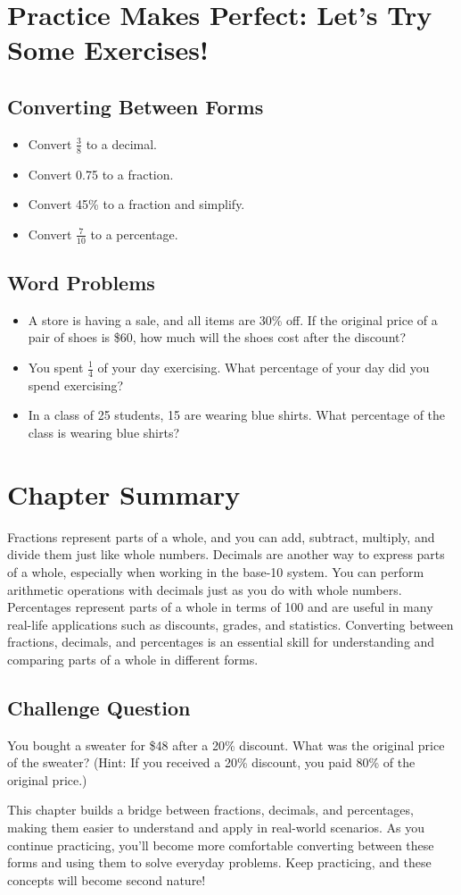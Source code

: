 \section{Practice Makes Perfect: Let’s Try Some Exercises!}
\subsection{Converting Between Forms}
\begin{itemize}
    \item Convert $\frac{3}{8}$ to a decimal.
    \item Convert 0.75 to a fraction.
    \item Convert 45\% to a fraction and simplify.
    \item Convert $\frac{7}{10}$ to a percentage.
\end{itemize}

\subsection{Word Problems}
\begin{itemize}
    \item A store is having a sale, and all items are 30\% off. If the original price of a pair of shoes is \$60, how much will the shoes cost after the discount?
    \item You spent $\frac{1}{4}$ of your day exercising. What percentage of your day did you spend exercising?
    \item In a class of 25 students, 15 are wearing blue shirts. What percentage of the class is wearing blue shirts?
\end{itemize}

\section{Chapter Summary}
Fractions represent parts of a whole, and you can add, subtract, multiply, and divide them just like whole numbers.
Decimals are another way to express parts of a whole, especially when working in the base-10 system. You can perform arithmetic operations with decimals just as you do with whole numbers.
Percentages represent parts of a whole in terms of 100 and are useful in many real-life applications such as discounts, grades, and statistics.
Converting between fractions, decimals, and percentages is an essential skill for understanding and comparing parts of a whole in different forms.

\subsection{Challenge Question}
You bought a sweater for \$48 after a 20\% discount. What was the original price of the sweater? (Hint: If you received a 20\% discount, you paid 80\% of the original price.)

This chapter builds a bridge between fractions, decimals, and percentages, making them easier to understand and apply in real-world scenarios. As you continue practicing, you'll become more comfortable converting between these forms and using them to solve everyday problems. Keep practicing, and these concepts will become second nature!